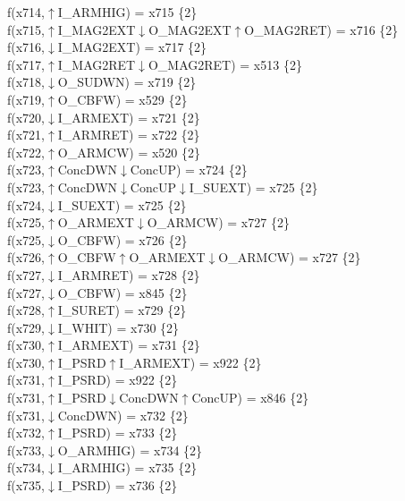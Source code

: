 f(x714,$\uparrow$I\_ARMHIG) = x715 \{2\} \\  
f(x715,$\uparrow$I\_MAG2EXT$\downarrow$O\_MAG2EXT$\uparrow$O\_MAG2RET) = x716 \{2\} \\  
f(x716,$\downarrow$I\_MAG2EXT) = x717 \{2\} \\  
f(x717,$\uparrow$I\_MAG2RET$\downarrow$O\_MAG2RET) = x513 \{2\} \\  
f(x718,$\downarrow$O\_SUDWN) = x719 \{2\} \\  
f(x719,$\uparrow$O\_CBFW) = x529 \{2\} \\  
f(x720,$\downarrow$I\_ARMEXT) = x721 \{2\} \\  
f(x721,$\uparrow$I\_ARMRET) = x722 \{2\} \\  
f(x722,$\uparrow$O\_ARMCW) = x520 \{2\} \\  
f(x723,$\uparrow$ConcDWN$\downarrow$ConcUP) = x724 \{2\} \\  
f(x723,$\uparrow$ConcDWN$\downarrow$ConcUP$\downarrow$I\_SUEXT) = x725 \{2\} \\  
f(x724,$\downarrow$I\_SUEXT) = x725 \{2\} \\  
f(x725,$\uparrow$O\_ARMEXT$\downarrow$O\_ARMCW) = x727 \{2\} \\  
f(x725,$\downarrow$O\_CBFW) = x726 \{2\} \\  
f(x726,$\uparrow$O\_CBFW$\uparrow$O\_ARMEXT$\downarrow$O\_ARMCW) = x727 \{2\} \\  
f(x727,$\downarrow$I\_ARMRET) = x728 \{2\} \\  
f(x727,$\downarrow$O\_CBFW) = x845 \{2\} \\  
f(x728,$\uparrow$I\_SURET) = x729 \{2\} \\  
f(x729,$\downarrow$I\_WHIT) = x730 \{2\} \\  
f(x730,$\uparrow$I\_ARMEXT) = x731 \{2\} \\  
f(x730,$\uparrow$I\_PSRD$\uparrow$I\_ARMEXT) = x922 \{2\} \\  
f(x731,$\uparrow$I\_PSRD) = x922 \{2\} \\  
f(x731,$\uparrow$I\_PSRD$\downarrow$ConcDWN$\uparrow$ConcUP) = x846 \{2\} \\  
f(x731,$\downarrow$ConcDWN) = x732 \{2\} \\  
f(x732,$\uparrow$I\_PSRD) = x733 \{2\} \\  
f(x733,$\downarrow$O\_ARMHIG) = x734 \{2\} \\  
f(x734,$\downarrow$I\_ARMHIG) = x735 \{2\} \\  
f(x735,$\downarrow$I\_PSRD) = x736 \{2\} \\  
